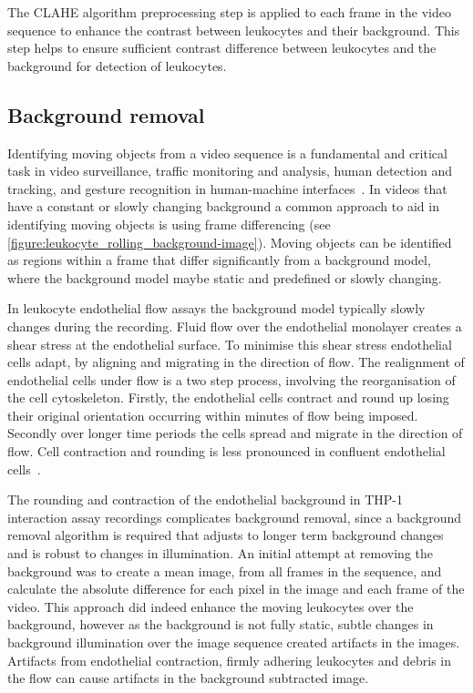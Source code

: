 The CLAHE algorithm preprocessing step is applied to each frame in the video sequence to enhance the contrast between leukocytes and their background. This step helps to ensure sufficient contrast difference between leukocytes and the background for detection of leukocytes.

\subsection{Background removal}
\label{leukocytes:processing:background}
Identifying moving objects from a video sequence is a fundamental and critical task in video surveillance, traffic monitoring and analysis, human detection and tracking, and gesture recognition in human-machine interfaces~\cite{Cheung2004}. In videos that have a constant or slowly changing background a common approach to aid in identifying moving objects is using frame differencing (see \autoref{figure:leukocyte_rolling_background-image}). Moving objects can be identified as regions within a frame that differ significantly from a background model, where the background model maybe static and predefined or slowly changing.

In leukocyte endothelial flow assays the background model typically slowly changes during the recording. Fluid flow over the endothelial monolayer creates a shear stress at the endothelial surface. To minimise this shear stress endothelial cells adapt, by aligning and migrating in the direction of flow. The realignment of endothelial cells under flow is a two step process, involving the reorganisation of the cell cytoskeleton. Firstly, the endothelial cells contract and round up losing their original orientation occurring within minutes of flow being imposed. Secondly over longer time periods the cells spread and migrate in the direction of flow. Cell contraction and rounding is less pronounced in confluent endothelial cells~\cite{Wells2011}.

The rounding and contraction of the endothelial background in THP-1 interaction assay recordings complicates background removal, since a background removal algorithm is required that adjusts to longer term background changes and is robust to changes in illumination. An initial attempt at removing the background was to create a mean image, from all frames in the sequence, and calculate the absolute difference for each pixel in the image and each frame of the video. This approach did indeed enhance the moving leukocytes over the background, however as the background is not fully static, subtle changes in background illumination over the image sequence created artifacts in the images. Artifacts from endothelial contraction, firmly adhering leukocytes and debris in the flow can cause artifacts in the background subtracted image.


